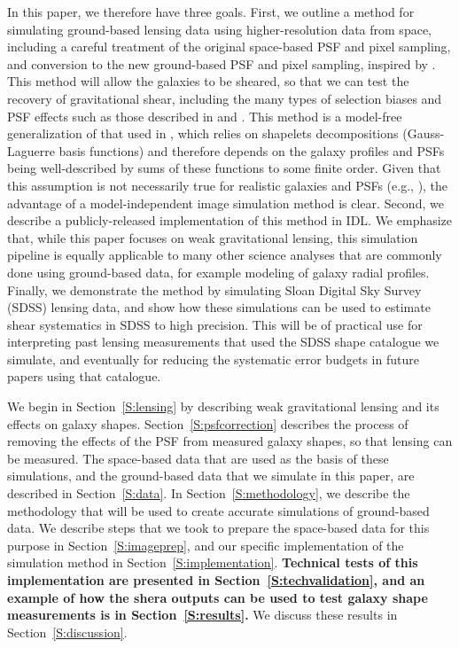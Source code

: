 \documentclass[twocolumn,useAMS,usenatbib]{mn2e}
\newcommand{\reftext}[1]{\textbf{#1}}
\begin{document}
In this paper, we therefore have three goals.  First, we outline a
method for simulating ground-based lensing data using
higher-resolution data from space, including a careful treatment of
the original space-based PSF and pixel sampling, and conversion to the
new ground-based PSF and pixel sampling, inspired by
\cite{2000ApJ...537..555K}.  This method will allow the galaxies to be
sheared, so that we can test the recovery of gravitational shear,
including the many types of selection biases and PSF effects such as
those described in \cite{2004MNRAS.353..529H} and
\cite{2005MNRAS.361.1287M}.  This method is a model-free
generalization of that used in \cite{2010PASP..122..947D}, which
relies on shapelets decompositions (Gauss-Laguerre basis functions)
and therefore depends on the galaxy profiles and PSFs being 
well-described by sums of these functions to some finite order.
Given that  this assumption is not necessarily
true for realistic galaxies and PSFs (e.g.,
\citealt{2010A&A...510A..75M}), the advantage 
of a model-independent image simulation method is clear.  
Second, we describe a publicly-released implementation of this method
in IDL.  We emphasize that, while this paper focuses on weak gravitational
lensing, this simulation pipeline is equally applicable to many other
science analyses that are commonly done using ground-based data, for
example modeling of galaxy radial profiles.  Finally, we
demonstrate the method by simulating Sloan Digital Sky Survey (SDSS) lensing data, and show how
these simulations can be used to estimate shear systematics in SDSS to
high precision.  This will be of practical use for interpreting past
lensing measurements that used the SDSS shape catalogue we simulate,
and eventually for
reducing the systematic error budgets in future papers using that catalogue.

We begin in Section~\ref{S:lensing} by describing weak gravitational
lensing and its effects on galaxy shapes.
Section~\ref{S:psfcorrection} describes the process of removing the
effects of the PSF from measured galaxy shapes, so that lensing can be
measured.  The space-based data that are used as the basis of these
simulations, and the ground-based data that we simulate in this paper,
are described in Section~\ref{S:data}.  In Section~\ref{S:methodology}, we describe the methodology
that will be used to create accurate simulations of ground-based
data.   We describe steps that we took to prepare the space-based data
for this purpose in Section~\ref{S:imageprep}, and our specific
implementation of the simulation method in Section~\ref{S:implementation}.
\reftext{Technical tests of this implementation are presented in
Section~\ref{S:techvalidation}, and an example of how the {\sc shera} 
outputs can be used to test galaxy shape measurements is in Section~\ref{S:results}. }
We discuss these results in Section~\ref{S:discussion}.  
\end{document}
